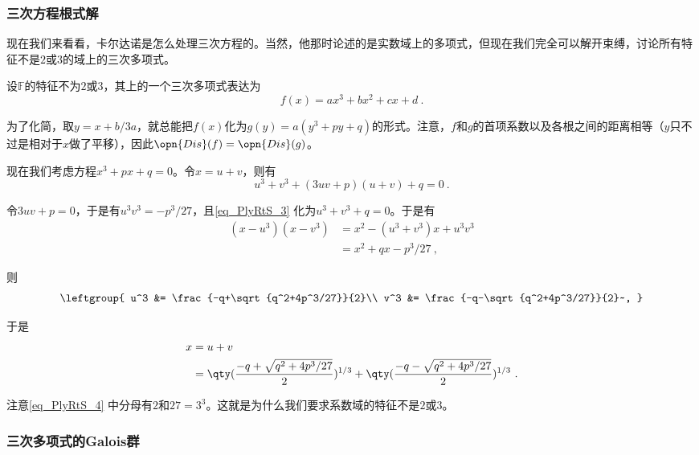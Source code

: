 \subsubsection{三次方程根式解}

现在我们来看看，卡尔达诺是怎么处理三次方程的。当然，他那时论述的是实数域上的多项式，但现在我们完全可以解开束缚，讨论所有特征不是$2$或$3$的域上的三次多项式。

设$\mathbb{F}$的特征不为$2$或$3$，其上的一个三次多项式表达为
\begin{equation}
f(x) = ax^3+bx^2+cx+d~.
\end{equation}

为了化简，取$y=x+b/3a$，就总能把$f(x)$化为$g(y)=a(y^3+py+q)$的形式。注意，$f$和$g$的首项系数以及各根之间的距离相等（$y$只不过是相对于$x$做了平移），因此$\opn{Dis}(f)=\opn{Dis}(g)$。

现在我们考虑方程$x^3+px+q=0$。令$x=u+v$，则有
\begin{equation}\label{eq_PlyRtS_3}
u^3+v^3+(3uv+p)(u+v)+q=0~.
\end{equation}

令$3uv+p=0$，于是有$u^3v^3=-p^3/27$，且\autoref{eq_PlyRtS_3} 化为$u^3+v^3+q=0$。于是有
\begin{equation}
\begin{aligned}
(x-u^3)(x-v^3) &= x^2-(u^3+v^3)x+u^3v^3\\
&= x^2+qx-p^3/27~,
\end{aligned}
\end{equation}

则
\begin{equation}
\leftgroup{
    u^3 &= \frac{-q+\sqrt{q^2+4p^3/27}}{2}\\
    v^3 &= \frac{-q-\sqrt{q^2+4p^3/27}}{2}~,
}
\end{equation}

于是
\begin{equation}\label{eq_PlyRtS_4}
\begin{aligned}
x&=u+v\\
&=\qty(\frac{-q+\sqrt{q^2+4p^3/27}}{2})^{1/3}+\qty(\frac{-q-\sqrt{q^2+4p^3/27}}{2})^{1/3}~.
\end{aligned}
\end{equation}

注意\autoref{eq_PlyRtS_4} 中分母有$2$和$27=3^3$。这就是为什么我们要求系数域的特征不是$2$或$3$。






\subsubsection{三次多项式的Galois群}


